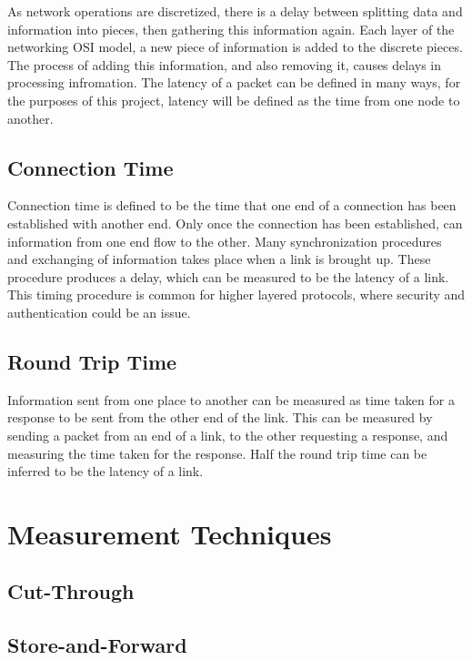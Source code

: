 \par As network operations are discretized, there is a delay between splitting data and information into pieces, then gathering this information again.
Each layer of the networking OSI model, a new piece of information is added to the discrete pieces.
The process of adding this information, and also removing it, causes delays in processing infromation.
The latency of a packet can be defined in many ways, for the purposes of this project, latency will be defined as the time from one node to another.

\subsection{Connection Time}

\par Connection time is defined to be the time that one end of a connection has been established with another end.
Only once the connection has been established, can information from one end flow to the other.
Many synchronization procedures and exchanging of information takes place when a link is brought up.
These procedure produces a delay, which can be measured to be the latency of a link.
This timing procedure is common for higher layered protocols, where security and authentication could be an issue.

\subsection{Round Trip Time}

\par Information sent from one place to another can be measured as time taken for a response to be sent from the other end of the link.
This can be measured by sending a packet from an end of a link, to the other requesting a response, and measuring the time taken for the response.
Half the round trip time can be inferred to be the latency of a link.

\section{Measurement Techniques}

\subsection{Cut-Through}

\subsection{Store-and-Forward}


